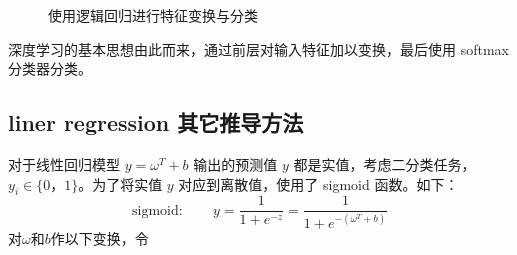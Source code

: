 \begin{figure}[htbp]
	\centering
	{\quad
}
\caption{使用逻辑回归进行特征变换与分类}
\label{fig:transform_feature}
\end{figure}

深度学习的基本思想由此而来，通过前层对输入特征加以变换，最后使用 softmax 分类器分类。
\subsection{liner regression 其它推导方法}

对于线性回归模型 $y=\omega^T+b$ 输出的预测值 $y$ 都是实值，考虑二分类任务，$y_i\in\{0，1\}$。为了将实值 $y$ 对应到离散值，使用了 sigmoid 函数。如下：
\[
\mathrm{sigmoid:} \qquad y=\frac{1}{1+e^{-z}}=\frac{1}{1+e^{-(\omega^T+b)}}
\] 
对$\omega$和$b$作以下变换，令

